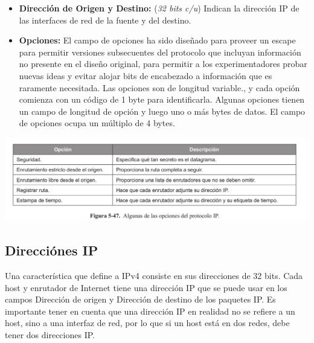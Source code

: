 \documentclass[10pt,a4paper]{report}
\begin{document}
\begin{itemize}
		\item \textbf{Dirección de Origen y Destino:} (\textit{32 bits c/u}) Indican la dirección IP de las interfaces de red de la fuente y del destino.
		\item \textbf{Opciones:} El campo de opciones ha sido diseñado para proveer un escape para permitir versiones subsecuentes del protocolo que incluyan
información no presente en el diseño original, para permitir a los experimentadores probar nuevas ideas y evitar alojar bits de encabezado a información que es raramente necesitada. Las opciones son de longitud variable., y cada opción comienza con un código de 1 byte para identificarla. Algunas opciones tienen un campo de longitud de opción y luego uno o más bytes de datos. El campo de opciones ocupa un múltiplo de 4 bytes.
	\end{itemize}
	
	\begin{center}
		\includegraphics[scale=0.3]{./imagenes/opcionesIP.png} 
	\end{center}
	\subsection{Direcciónes IP}
	Una característica que define a IPv4 consiste en sus direcciones de 32 bits. Cada host y enrutador de Internet tiene una dirección IP que se puede usar en los campos Dirección de origen y Dirección de destino de los paquetes IP. Es importante tener en cuenta que una dirección IP en realidad no se refiere a un host, sino
a una interfaz de red, por lo que si un host está en dos redes, debe tener dos direcciones IP.
\end{document}
